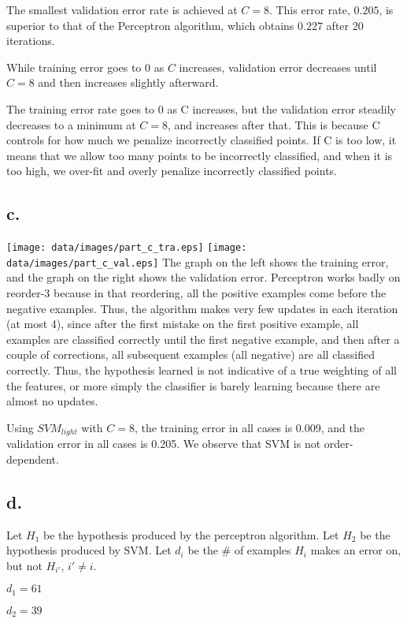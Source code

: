\documentclass[]{article}
\begin{document}
The smallest validation error rate is achieved at $C = 8$. This error rate, $0.205$, is superior to that of the Perceptron algorithm, which obtains $0.227$ after 20 iterations.

While training error goes to 0 as $C$ increases, validation error decreases until $C=8$ and then increases slightly afterward.

The training error rate goes to 0 as C increases, but the validation error steadily decreases to a minimum at $C=8$, and increases after that. This is because C controls for how much we penalize incorrectly classified points. If C is too low, it means that we allow too many points to be incorrectly classified, and when it is too high, we over-fit and overly penalize incorrectly classified points.

\subsection{c.}
\texttt{[image: data/images/part\_c\_tra.eps]}
\texttt{[image: data/images/part\_c\_val.eps]}
The graph on the left shows the training error, and the graph on the right shows the validation error. Perceptron works badly on reorder-3 because in that reordering, all the positive examples come before the negative examples. Thus, the algorithm makes very few updates in each iteration (at most 4), since after the first mistake on the first positive example, all examples are classified correctly until the first negative example, and then after a couple of corrections, all subsequent examples (all negative) are all classified correctly. Thus, the hypothesis learned is not indicative of a true weighting of all the features, or more simply the classifier is barely learning because there are almost no updates.

Using $SVM_{light}$ with $C=8$, the training error in all cases is 0.009, and the validation error in all cases is 0.205. We observe that SVM is not order-dependent.

\subsection{d.}
Let $H_1$ be the hypothesis produced by the perceptron algorithm. Let $H_2$ be the hypothesis produced by SVM. Let $d_i$ be the \# of examples $H_i$ makes an error on, but not $H_{i'}$, $i' \neq i$.

$d_1 = 61$

$d_2 = 39$
\end{document}
